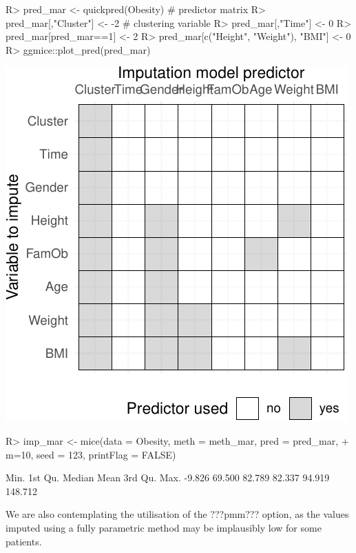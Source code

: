 \documentclass[
]{jss}
\begin{document}
\begin{CodeChunk}
\begin{CodeInput}
R> pred_mar <- quickpred(Obesity)   # predictor matrix
R> pred_mar[,"Cluster"] <- -2 # clustering variable
R> pred_mar[,"Time"] <- 0
R> pred_mar[pred_mar==1] <- 2
R> pred_mar[c("Height", "Weight"), "BMI"] <- 0
R> ggmice::plot_pred(pred_mar)
\end{CodeInput}


\begin{center}\includegraphics[width=0.7\linewidth]{Imputation_of_Incomplete_Multilevel_Data_files/figure-latex/obesity-predmar-1} \end{center}

\begin{CodeInput}
R> imp_mar <- mice(data = Obesity, meth = meth_mar, pred = pred_mar,
+                 m=10, seed = 123, printFlag = FALSE)
\end{CodeInput}
\end{CodeChunk}

\begin{CodeChunk}
\begin{CodeOutput}
   Min. 1st Qu.  Median    Mean 3rd Qu.    Max. 
 -9.826  69.500  82.789  82.337  94.919 148.712 
\end{CodeOutput}
\end{CodeChunk}

We are also contemplating the utilisation of the ???pmm??? option, as
the values imputed using a fully parametric method may be implausibly
low for some patients.
\end{document}
